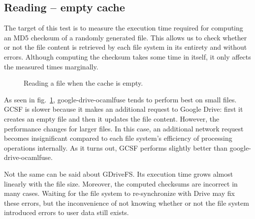\subsection{Reading -- empty cache} \label{reading_empty_cache}

The target of this test is to measure the execution time required for computing an MD5 checksum of a randomly generated file. This allows us to check whether or not the file content is retrieved by each file system in its entirety and without errors. Although computing the checksum takes some time in itself, it only affects the measured times marginally.


\begin{figure}[bpt]
\centering
{}
\caption{Reading a file when the cache is empty.}
\label{fig:fresh_read_benchmark}
\end{figure}

As seen in fig.~\ref{fig:fresh_read_benchmark}, google-drive-ocamlfuse tends to perform best on small files. GCSF is slower because it makes an additional request to Google Drive: first it creates an empty file and then it updates the file content. However, the performance changes for larger files. In this case, an additional network request becomes insignificant compared to each file system's efficiency of processing operations internally. As it turns out, GCSF performs slightly better than google-drive-ocamlfuse.

Not the same can be said about GDriveFS. Its execution time grows almost linearly with the file size. Moreover, the computed checksums are incorrect in many cases. Waiting for the file system to re-synchronize with Drive may fix these errors, but the inconvenience of not knowing whether or not the file system introduced errors to user data still exists.

